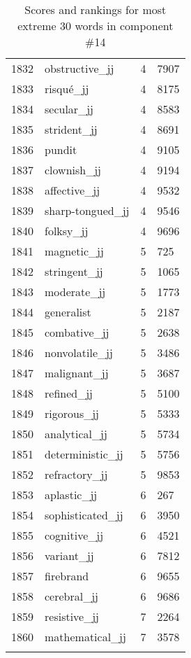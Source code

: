 \begin{longtable}[!htbp]{| rlr@{.}l |}
    1832 & obstructive\_jj & 4 & 7907 \\
    1833 & risqué\_jj & 4 & 8175 \\
    1834 & secular\_jj & 4 & 8583 \\
    1835 & strident\_jj & 4 & 8691 \\
    1836 & pundit & 4 & 9105 \\
    1837 & clownish\_jj & 4 & 9194 \\
    1838 & affective\_jj & 4 & 9532 \\
    1839 & sharp-tongued\_jj & 4 & 9546 \\
    1840 & folksy\_jj & 4 & 9696 \\
    1841 & magnetic\_jj & 5 & 725 \\
    1842 & stringent\_jj & 5 & 1065 \\
    1843 & moderate\_jj & 5 & 1773 \\
    1844 & generalist & 5 & 2187 \\
    1845 & combative\_jj & 5 & 2638 \\
    1846 & nonvolatile\_jj & 5 & 3486 \\
    1847 & malignant\_jj & 5 & 3687 \\
    1848 & refined\_jj & 5 & 5100 \\
    1849 & rigorous\_jj & 5 & 5333 \\
    1850 & analytical\_jj & 5 & 5734 \\
    1851 & deterministic\_jj & 5 & 5756 \\
    1852 & refractory\_jj & 5 & 9853 \\
    1853 & aplastic\_jj & 6 & 267 \\
    1854 & sophisticated\_jj & 6 & 3950 \\
    1855 & cognitive\_jj & 6 & 4521 \\
    1856 & variant\_jj & 6 & 7812 \\
    1857 & firebrand & 6 & 9655 \\
    1858 & cerebral\_jj & 6 & 9686 \\
    1859 & resistive\_jj & 7 & 2264 \\
    1860 & mathematical\_jj & 7 & 3578 \\
    \hline
    \caption{Scores and rankings for most extreme 30 words in component \#14} \\
\end{longtable}

